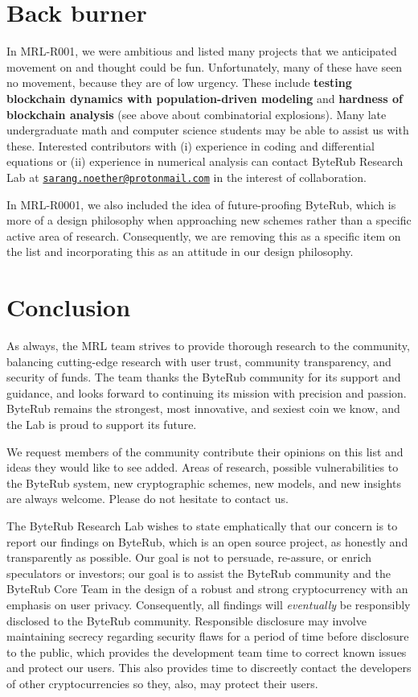 \documentclass[12pt,english]{mrl}
\theoremstyle{definition}
\numberwithin{equation}{section}
\numberwithin{figure}{section}
\numberwithin{equation}{section}
\numberwithin{equation}{section}
\numberwithin{figure}{section}
\begin{document}
\section{Back burner}

In MRL-R001, we were ambitious and listed many projects that we anticipated movement on and thought could be fun. Unfortunately, many of these have seen no movement, because they are of low urgency. These include \textbf{testing blockchain dynamics with population-driven modeling} and \textbf{hardness of blockchain analysis} (see above about combinatorial explosions). Many late undergraduate math and computer science students may be able to assist us with these. Interested contributors with (i) experience in coding and differential equations or (ii) experience in numerical analysis can contact ByteRub Research Lab at \href{mailto:sarang.noether@protonmail.com}{\texttt{sarang.noether@protonmail.com}} in the interest of collaboration.

In MRL-R0001, we also included the idea of future-proofing ByteRub, which is more of a design philosophy when approaching new schemes rather than a specific active area of research. Consequently, we are removing this as a specific item on the list and incorporating this as an attitude in our design philosophy.



\section*{Conclusion}

As always, the MRL team strives to provide thorough research to the community, balancing cutting-edge research with user trust, community transparency, and security of funds. The team thanks the ByteRub community for its support and guidance, and looks forward to continuing its mission with precision and passion. ByteRub remains the strongest, most innovative, and sexiest coin we know, and the Lab is proud to support its future.

We request members of the community contribute their opinions on this list and ideas they would like to see added. Areas of research, possible vulnerabilities to the ByteRub system, new cryptographic schemes, new models, and new insights are always welcome. Please do not hesitate to contact us.  

The ByteRub Research Lab wishes to state emphatically that our concern is to report our findings on ByteRub, which is an open source project, as honestly and transparently as possible. Our goal is not to persuade, re-assure, or enrich speculators or investors; our goal is to assist the ByteRub community and the ByteRub Core Team in the design of a robust and strong cryptocurrency with an emphasis on user privacy.  Consequently, all findings will \textit{eventually} be responsibly disclosed to the ByteRub community. Responsible disclosure may involve maintaining secrecy regarding security flaws for a period of time before disclosure to the public, which provides the development team time to correct known issues and protect our users. This also provides time to discreetly contact the developers of other cryptocurrencies so they, also, may protect their users.
\end{document}
